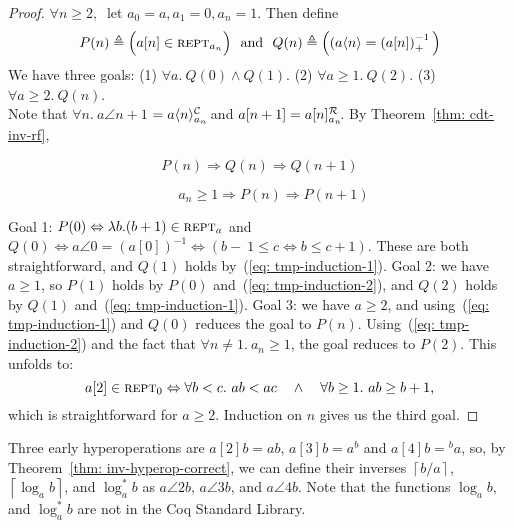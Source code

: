 \begin{proof}
$\forall n \ge 2,~$ let $a_0 = a, a_1 = 0, a_n = 1$. Then define
\begin{equation*}
P(n) \triangleq  \Big(a[n] \in \text{\scshape{rept}}_{a_n}\Big)\ \text{ and } \
Q(n) \triangleq  \Big((a\langle n\rangle = \left(a[n]\right)^{-1}_+ \Big)
\end{equation*}
We have three goals:
(1) $\forall a.~ Q(0) \wedge Q(1)$.
(2) $\forall a \ge 1.~ Q(2)$.
(3) $\forall a \ge 2.~ Q(n)$. \\
Note that \mbox{$\forall n.~ a\angle{n+1}$} $= \cdt{a\angle{n}}{a_n}$ and $a[n+1] = \rf{a[n]}{a_n}$. By Theorem~\ref{thm: cdt-inv-rf},

\vspace*{-1em}
\noindent\begin{minipage}{.45\linewidth}
\begin{equation}
P(n) \Rightarrow Q(n) \Rightarrow Q(n+1) \label{eq: tmp-induction-1}
\end{equation}
\end{minipage}
\begin{minipage}{.55\linewidth}
\begin{equation}
\qquad a_{n} \ge 1 \Rightarrow P(n) \Rightarrow P(n+1) \label{eq: tmp-induction-2}
\end{equation}
\end{minipage}
Goal 1: $P(0) \Leftrightarrow \lambda b.(b+1)\in \text{\scshape{rept}}_a$ and
$Q(0) \iff a\angle{0} = \left(a[0]\right)^{-1} \iff (b-~1\le c \iff b\le c+1)$.
These are both straightforward, and $Q(1)$ holds by~(\ref{eq: tmp-induction-1}). Goal 2: we have $a \ge 1$, so
$P(1)$ holds by $P(0)$ and~(\ref{eq: tmp-induction-2}), and 
$Q(2)$ holds by $Q(1)$ and~(\ref{eq: tmp-induction-1}).
Goal 3: we have $a\ge 2$, and using~(\ref{eq: tmp-induction-1}) and $Q(0)$
reduces the goal to $P(n)$. Using~(\ref{eq: tmp-induction-2}) and the fact that $\forall n \neq 1.~a_n\ge 1$, the goal reduces to $P(2)$. This unfolds to:
\begin{equation*}
a[2]\in \text{\scshape{rept}}_0 \Leftrightarrow \forall b < c.~ab < ac \quad \wedge \quad \forall b \ge 1.~ab \ge b+1\text{,}
\end{equation*}
which is straightforward for $a\ge 2$. Induction on $n$ gives us the third goal.
\end{proof}
\begin{rem}
Three early hyperoperations are $a[2]b = ab$, $a[3]b = a^b$ and \linebreak $a[4]b = \! ^ba$, so, by Theorem~\ref{thm: inv-hyperop-correct}, we can define their inverses $\left\lceil b/a \right\rceil$, $\left\lceil \log_a b \right\rceil$, and $\log^*_a b$ as $a\angle{2}b$, $a\angle{3}b$, and $a\angle{4}b$.
Note that the functions $\log_a b$, and $\log^*_a b$ are not in the Coq Standard Library.
\end{rem}

